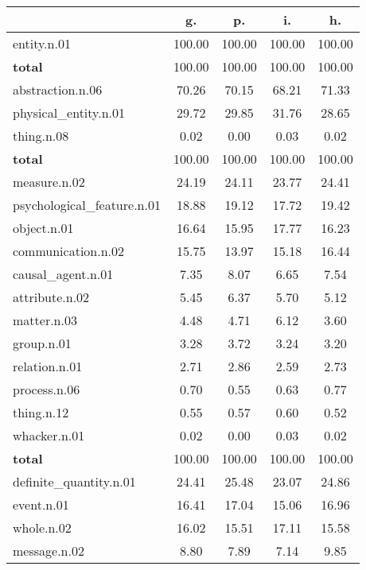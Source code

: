 \begin{table}[h!]
\begin{center}
\begin{tabular}{| l || c | c | c | c |}\hline
 & {\bf g.} & {\bf p.} & {\bf i.} & {\bf h.} \\\hline\hline
entity.n.01 & 100.00  & 100.00  & 100.00  & 100.00 \\\hline\hline
{{\bf total}} & 100.00  & 100.00  & 100.00  & 100.00 \\\hline\hline\hline
abstraction.n.06 & 70.26  & 70.15  & 68.21  & 71.33 \\\hline
physical\_entity.n.01 & 29.72  & 29.85  & 31.76  & 28.65 \\\hline
thing.n.08 & 0.02  & 0.00  & 0.03  & 0.02 \\\hline\hline
{{\bf total}} & 100.00  & 100.00  & 100.00  & 100.00 \\\hline\hline\hline
measure.n.02 & 24.19  & 24.11  & 23.77  & 24.41 \\\hline
psychological\_feature.n.01 & 18.88  & 19.12  & 17.72  & 19.42 \\\hline
object.n.01 & 16.64  & 15.95  & 17.77  & 16.23 \\\hline
communication.n.02 & 15.75  & 13.97  & 15.18  & 16.44 \\\hline
causal\_agent.n.01 & 7.35  & 8.07  & 6.65  & 7.54 \\\hline
attribute.n.02 & 5.45  & 6.37  & 5.70  & 5.12 \\\hline
matter.n.03 & 4.48  & 4.71  & 6.12  & 3.60 \\\hline
group.n.01 & 3.28  & 3.72  & 3.24  & 3.20 \\\hline
relation.n.01 & 2.71  & 2.86  & 2.59  & 2.73 \\\hline
process.n.06 & 0.70  & 0.55  & 0.63  & 0.77 \\\hline
thing.n.12 & 0.55  & 0.57  & 0.60  & 0.52 \\\hline
whacker.n.01 & 0.02  & 0.00  & 0.03  & 0.02 \\\hline\hline
{{\bf total}} & 100.00  & 100.00  & 100.00  & 100.00 \\\hline\hline\hline
definite\_quantity.n.01 & 24.41  & 25.48  & 23.07  & 24.86 \\\hline
event.n.01 & 16.41  & 17.04  & 15.06  & 16.96 \\\hline
whole.n.02 & 16.02  & 15.51  & 17.11  & 15.58 \\\hline
message.n.02 & 8.80  & 7.89  & 7.14  & 9.85 \\\hline

\end{tabular}
\end{center}
\end{table}
